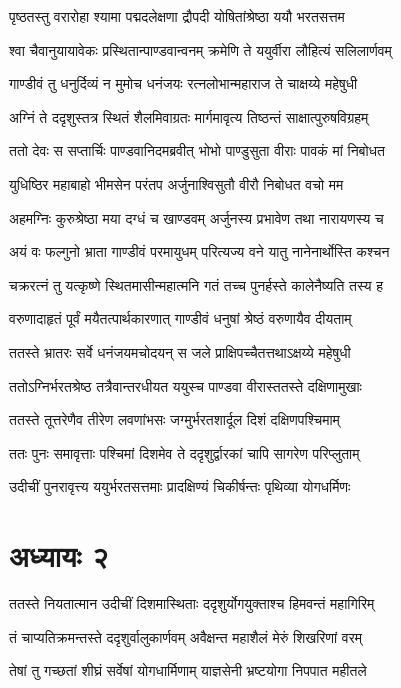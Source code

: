\threelineshloka
{पृष्ठतस्तु वरारोहा श्यामा पद्मदलेक्षणा}
{द्रौपदी योषितांश्रेष्ठा ययौ भरतसत्तम}
{}


\twolineshloka
{श्वा चैवानुयायावेकः प्रस्थितान्पाण्डवान्वनम्}
{क्रमेणि ते ययुर्वीरा लौहित्यं सलिलार्णवम्}


\twolineshloka
{गाण्डीवं तु धनुर्दिव्यं न मुमोच धनंजयः}
{रत्नलोभान्महाराज ते चाक्षय्ये महेषुधी}


\twolineshloka
{अग्निं ते ददृशुस्तत्र स्थितं शैलमिवाग्रतः}
{मार्गमावृत्य तिष्ठन्तं साक्षात्पुरुषविग्रहम्}


\twolineshloka
{ततो देवः स सप्तार्चिः पाण्डवानिदमब्रवीत्}
{भोभो पाण्डुसुता वीराः पावकं मां निबोधत}


\twolineshloka
{युधिष्ठिर महाबाहो भीमसेन परंतप}
{अर्जुनाश्विसुतौ वीरौ निबोधत वचो मम}


\twolineshloka
{अहमग्निः कुरुश्रेष्ठा मया दग्धं च खाण्डवम्}
{अर्जुनस्य प्रभावेण तथा नारायणस्य च}


\twolineshloka
{अयं वः फल्गुनो भ्राता गाण्डीवं परमायुधम्}
{परित्यज्य वने यातु नानेनार्थोस्ति कश्चन}


\twolineshloka
{चक्ररत्नं तु यत्कृष्णे स्थितमासीन्महात्मनि}
{गतं तच्च पुनर्हस्ते कालेनैष्यति तस्य ह}


\twolineshloka
{वरुणादाहृतं पूर्वं मयैतत्पार्थकारणात्}
{गाण्डीवं धनुषां श्रेष्ठं वरुणायैव दीयताम्}


\twolineshloka
{ततस्ते भ्रातरः सर्वे धनंजयमचोदयन्}
{स जले प्राक्षिपच्चैतत्तथाऽक्षय्ये महेषुधी}


\twolineshloka
{ततोऽग्निर्भरतश्रेष्ठ तत्रैवान्तरधीयत}
{ययुस्च पाण्डवा वीरास्ततस्ते दक्षिणामुखाः}


\twolineshloka
{ततस्ते तूत्तरेणैव तीरेण लवणांभसः}
{जग्मुर्भरतशार्दूल दिशं दक्षिणपश्चिमाम्}


\twolineshloka
{ततः पुनः समावृत्ताः पश्चिमां दिशमेव ते}
{ददृशुर्द्वारकां चापि सागरेण परिप्लुताम्}


\twolineshloka
{उदीचीं पुनरावृत्त्य ययुर्भरतसत्तमाः}
{प्रादक्षिण्यं चिकीर्षन्तः पृथिव्या योगधर्मिणः}


\chapter{अध्यायः २}
\twolineshloka
{ततस्ते नियतात्मान उदीचीं दिशमास्थिताः}
{ददृशुर्योगयुक्ताश्च हिमवन्तं महागिरिम्}


\twolineshloka
{तं चाप्यतिक्रमन्तस्ते ददृशुर्वालुकार्णवम्}
{अवैक्षन्त महाशैलं मेरुं शिखरिणां वरम्}


\twolineshloka
{तेषां तु गच्छतां शीघ्रं सर्वेषां योगधार्मिणाम्}
{याज्ञसेनी भ्रष्टयोगा निपपात महीतले}


